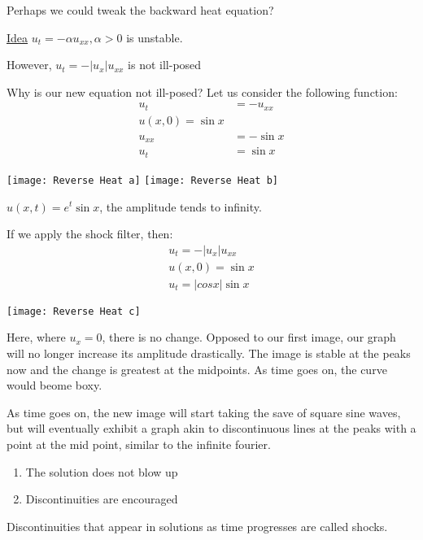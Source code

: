 Perhaps we could tweak the backward heat equation?

\underline{Idea} $u_t = -\alpha u_{xx}, \alpha > 0$ is unstable.

However, $u_t = -|u_x| u_{xx}$ is not ill-posed

Why is our new equation not ill-posed? Let us consider the following function:
%
\begin{align*}
  u_t & = -u_{xx}\\
  u(x, 0) = \sin x\\
  u_{xx} & = -\sin x\\
  u_t & = \sin x
\end{align*}

\begin{center}
  \texttt{[image: Reverse Heat a]}
  \texttt{[image: Reverse Heat b]}
\end{center}

$u(x, t) = e^t \sin x$, the amplitude tends to infinity.

If we apply the shock filter, then:
%
\begin{align*}
  u_t = -|u_x| u_{xx}\\
  u(x, 0) = \sin x\\
  u_t = |cos x| \sin x
\end{align*}

\begin{center}
  \texttt{[image: Reverse Heat c]}
\end{center}

Here, where $u_x = 0$, there is no change. Opposed to our first image, our graph will no longer increase its amplitude drastically. The image is stable at the peaks now and the change is greatest at the midpoints. As time goes on, the curve would beome boxy.

As time goes on, the new image will start taking the save of square sine waves, but will eventually exhibit a graph akin to discontinuous lines at the peaks with a point at the mid point, similar to the infinite fourier.

\note
\begin{enumerate}
  \item The solution does not blow up
  \item Discontinuities are encouraged
\end{enumerate}


\dfn Discontinuities that appear in solutions as time progresses are called shocks.

